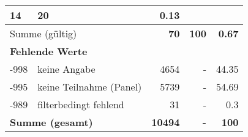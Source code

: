\begin{longtable}{lXrrr}
       \num{14} &
       \num[round-mode=places,round-precision=2]{20} &
         \num[round-mode=places,round-precision=2]{0.13} \\
     \midrule
     \multicolumn{2}{l}{Summe (gültig)} &
       \textbf{\num{70}} &
     \textbf{\num{100}} &
       \textbf{\num[round-mode=places,round-precision=2]{0.67}} \\
     \multicolumn{5}{l}{\textbf{Fehlende Werte}}\\
       -998 &
       keine Angabe &
         \num{4654} &
        - &
         \num[round-mode=places,round-precision=2]{44.35} \\
       -995 &
       keine Teilnahme (Panel) &
         \num{5739} &
        - &
         \num[round-mode=places,round-precision=2]{54.69} \\
       -989 &
       filterbedingt fehlend &
         \num{31} &
        - &
         \num[round-mode=places,round-precision=2]{0.3} \\
     \midrule
     \multicolumn{2}{l}{\textbf{Summe (gesamt)}} &
          \textbf{\num{10494}} &
        \textbf{-} &
        \textbf{\num{100}} \\
     \bottomrule
     \end{longtable}
     
